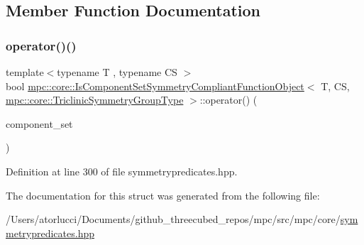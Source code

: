\subsection{Member Function Documentation}
\mbox{\label{structmpc_1_1core_1_1_is_component_set_symmetry_compliant_function_object_3_01_t_00_01_c_s_00_01d3c1d925f2eca11cbddbc5600942f490_afe0b64cc452da24122005d62f5f5c724}} 
\subsubsection{\texorpdfstring{operator()()}{operator()()}}
{\footnotesize\ttfamily template$<$typename T , typename CS $>$ \\
bool \mbox{\hyperlink{structmpc_1_1core_1_1_is_component_set_symmetry_compliant_function_object}{mpc\+::core\+::\+Is\+Component\+Set\+Symmetry\+Compliant\+Function\+Object}}$<$ T, CS, \mbox{\hyperlink{structmpc_1_1core_1_1_triclinic_symmetry_group_type}{mpc\+::core\+::\+Triclinic\+Symmetry\+Group\+Type}} $>$\+::operator() (\begin{DoxyParamCaption}\item[{const std\+::set$<$ \mbox{\hyperlink{namespacempc_1_1core_ac3a232afc7c680d580628e834030482f}{mpc\+::core\+::\+Tensor\+Rank4\+Component}}$<$ T $>$ $>$ \&}]{component\+\_\+set }\end{DoxyParamCaption})\hspace{0.3cm}{\ttfamily [inline]}}



Definition at line 300 of file symmetrypredicates.\+hpp.



The documentation for this struct was generated from the following file\+:\begin{DoxyCompactItemize}
\item 
/\+Users/atorlucci/\+Documents/github\+\_\+threecubed\+\_\+repos/mpc/src/mpc/core/\mbox{\hyperlink{symmetrypredicates_8hpp}{symmetrypredicates.\+hpp}}\end{DoxyCompactItemize}
